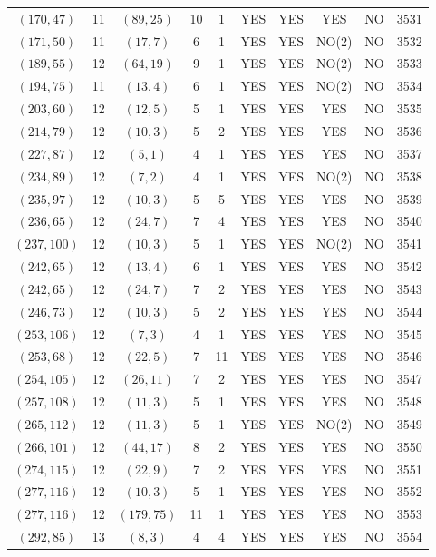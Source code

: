 \begin{longtable}{|c|c|c|c|c|c|c|c|c|c|}
$(170, 47)$ & 11 & $(89, 25)$ & 10 & 1 & YES & YES & YES & NO & 3531\\
$(171, 50)$ & 11 & $(17, 7)$ & 6 & 1 & YES & YES & NO(2) & NO & 3532\\
$(189, 55)$ & 12 & $(64, 19)$ & 9 & 1 & YES & YES & NO(2) & NO & 3533\\
$(194, 75)$ & 11 & $(13, 4)$ & 6 & 1 & YES & YES & NO(2) & NO & 3534\\
$(203, 60)$ & 12 & $(12, 5)$ & 5 & 1 & YES & YES & YES & NO & 3535\\
$(214, 79)$ & 12 & $(10, 3)$ & 5 & 2 & YES & YES & YES & NO & 3536\\
$(227, 87)$ & 12 & $(5, 1)$ & 4 & 1 & YES & YES & YES & NO & 3537\\
$(234, 89)$ & 12 & $(7, 2)$ & 4 & 1 & YES & YES & NO(2) & NO & 3538\\
$(235, 97)$ & 12 & $(10, 3)$ & 5 & 5 & YES & YES & YES & NO & 3539\\
$(236, 65)$ & 12 & $(24, 7)$ & 7 & 4 & YES & YES & YES & NO & 3540\\
$(237, 100)$ & 12 & $(10, 3)$ & 5 & 1 & YES & YES & NO(2) & NO & 3541\\
$(242, 65)$ & 12 & $(13, 4)$ & 6 & 1 & YES & YES & YES & NO & 3542\\
$(242, 65)$ & 12 & $(24, 7)$ & 7 & 2 & YES & YES & YES & NO & 3543\\
$(246, 73)$ & 12 & $(10, 3)$ & 5 & 2 & YES & YES & YES & NO & 3544\\
$(253, 106)$ & 12 & $(7, 3)$ & 4 & 1 & YES & YES & YES & NO & 3545\\
$(253, 68)$ & 12 & $(22, 5)$ & 7 & 11 & YES & YES & YES & NO & 3546\\
$(254, 105)$ & 12 & $(26, 11)$ & 7 & 2 & YES & YES & YES & NO & 3547\\
$(257, 108)$ & 12 & $(11, 3)$ & 5 & 1 & YES & YES & YES & NO & 3548\\
$(265, 112)$ & 12 & $(11, 3)$ & 5 & 1 & YES & YES & NO(2) & NO & 3549\\
$(266, 101)$ & 12 & $(44, 17)$ & 8 & 2 & YES & YES & YES & NO & 3550\\
$(274, 115)$ & 12 & $(22, 9)$ & 7 & 2 & YES & YES & YES & NO & 3551\\
$(277, 116)$ & 12 & $(10, 3)$ & 5 & 1 & YES & YES & YES & NO & 3552\\
$(277, 116)$ & 12 & $(179, 75)$ & 11 & 1 & YES & YES & YES & NO & 3553\\
$(292, 85)$ & 13 & $(8, 3)$ & 4 & 4 & YES & YES & YES & NO & 3554\\

\end{longtable}

